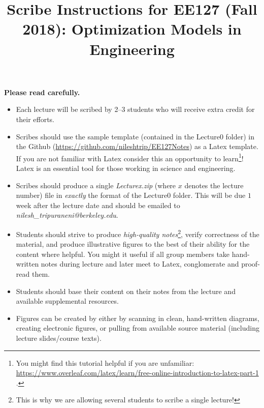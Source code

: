 \documentclass[12pt]{article}
\title{Scribe Instructions for EE127 (Fall 2018): Optimization Models in Engineering}
\date{}
\begin{document}
\maketitle

{\bf\color{red} Please read carefully.}

\begin{itemize}
\item Each lecture will be scribed by 2--3 students who will receive extra credit for their efforts.

\item Scribes should use the sample template (contained in the Lecture0 folder) in the Github (\url{https://github.com/nileshtrip/EE127Notes}) as a Latex template. If you are not familiar with Latex consider this an opportunity to learn\footnote{You might find this tutorial helpful if you are unfamiliar: \url{https://www.overleaf.com/latex/learn/free-online-introduction-to-latex-part-1} .}! Latex is an essential tool for those working in science and engineering.

\item Scribes should produce a single \emph{Lecturex.zip} (where $x$ denotes the lecture number) file in \textit{exactly} the format of the Lecture0 folder. This will be due $1$ week after the lecture date and should be emailed to \emph{nilesh\_tripuraneni@berkeley.edu}.

\item Students should strive to produce \textit{high-quality notes}\footnote{This is why we are allowing several students to scribe a single lecture!}, verify correctness of the material, and produce illustrative figures to the best of their ability for the content where helpful. You might it useful if all group members take hand-written notes during lecture and later meet to Latex, conglomerate and proof-read them.

\item Students should base their content on their notes from the lecture and available supplemental resources.

\item Figures can be created by either by scanning in clean, hand-written diagrams, creating electronic figures, or pulling from available source material (including lecture slides/course texts).


\end{itemize}
\end{document}
